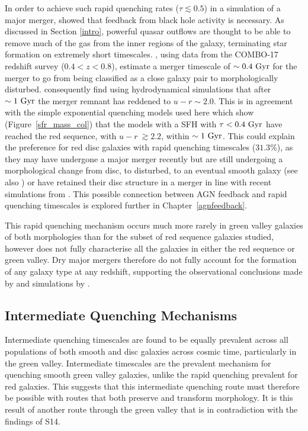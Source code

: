 In order to achieve such rapid quenching rates ($\tau \lesssim 0.5$) in a simulation of a major merger, \citet*{springel05} showed that feedback from black hole activity is necessary. As discussed in Section \ref{intro}, powerful quasar outflows are thought to be able to remove much of the gas from the inner regions of the galaxy, terminating star formation on extremely short timescales. \citet{Bell06}, using data from the COMBO-17 redshift survey ($0.4 < z < 0.8$), estimate a merger timescale of $\sim 0.4~\rm{Gyr}$ for the merger to go from being classified as a close galaxy pair to morphologically disturbed. \citet*{springel05b} consequently find using hydrodynamical simulations that after $\sim1~\rm{Gyr}$ the merger remnant has reddened to $u-r \sim 2.0$. This is in agreement with the simple exponential quenching models used here which show (Figure~\ref{sfr_mass_col}) that the models with a SFH with $\tau < 0.4~\rm{Gyr}$ have reached the red sequence, with $u-r ~\gtrsim 2.2$, within $\sim1~\rm{Gyr}$. This could explain the preference for red disc galaxies with rapid quenching timescales ($31.3\%$), as they may have undergone a major merger recently but are still undergoing a morphological change from disc, to disturbed, to an eventual smooth galaxy (see also \citealt{vdW09}) or have retained their disc structure in a merger in line with recent simulations from \citet{pontzen16}. This possible connection between AGN feedback and rapid quenching timescales is explored further in Chapter~\ref{agnfeedback}. 

This rapid quenching mechanism occurs much more rarely in green valley galaxies of both morphologies than for the subset of red sequence galaxies studied, however does not fully characterise all the galaxies in either the red sequence or green valley. Dry major mergers therefore do not fully account for the formation of any galaxy type at any redshift, supporting the observational conclusions made by \citet{Bell07,Bundy07, kaviraj14a} and simulations by \citet{Genel08}. 

\subsection{Intermediate Quenching Mechanisms}\label{int}

Intermediate quenching timescales are found to be equally prevalent across  all populations of both smooth and disc galaxies across cosmic time,  particularly in the green valley. Intermediate timescales are the prevalent mechanism for quenching smooth green valley galaxies, unlike the rapid quenching prevalent for red galaxies. This suggests that this intermediate quenching route must therefore be possible with routes that both preserve and transform morphology. It is this result of another route through the green valley that is in contradiction with the findings of S14. 

